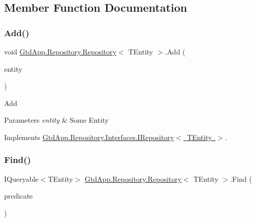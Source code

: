 \subsection{Member Function Documentation}
\mbox{\label{class_gtd_app_1_1_repository_1_1_repository_ad39a0d4a4e385b554881f0195d8b9c3e}} 
\subsubsection{\texorpdfstring{Add()}{Add()}}
{\footnotesize\ttfamily void \mbox{\hyperlink{class_gtd_app_1_1_repository_1_1_repository}{Gtd\+App.\+Repository.\+Repository}}$<$ T\+Entity $>$.Add (\begin{DoxyParamCaption}\item[{T\+Entity}]{entity }\end{DoxyParamCaption})}



Add 


\begin{DoxyParams}{Parameters}
{\em entity} & Some Entity\\
\hline
\end{DoxyParams}


Implements \mbox{\hyperlink{interface_gtd_app_1_1_repository_1_1_interfaces_1_1_i_repository_aa9b2613543ca7471d34aa20f57706604}{Gtd\+App.\+Repository.\+Interfaces.\+I\+Repository$<$ T\+Entity $>$}}.

\mbox{\label{class_gtd_app_1_1_repository_1_1_repository_a4116e83efd4b289ba315be6e68e81eb4}} 
\subsubsection{\texorpdfstring{Find()}{Find()}}
{\footnotesize\ttfamily I\+Queryable$<$T\+Entity$>$ \mbox{\hyperlink{class_gtd_app_1_1_repository_1_1_repository}{Gtd\+App.\+Repository.\+Repository}}$<$ T\+Entity $>$.Find (\begin{DoxyParamCaption}\item[{Expression$<$ Func$<$ T\+Entity, bool $>$$>$}]{predicate }\end{DoxyParamCaption})}



